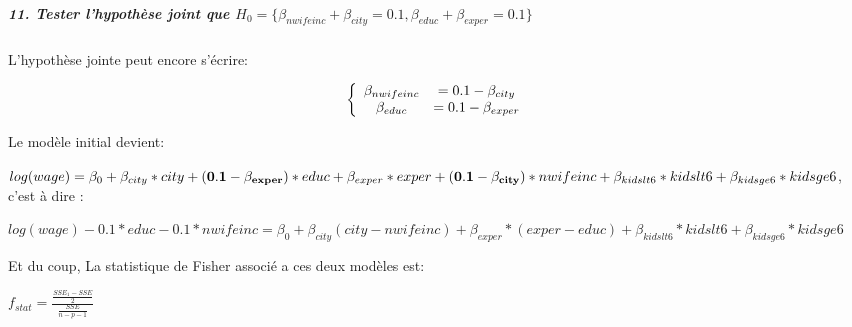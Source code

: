 \documentclass[11pt]{article}
\begin{document}
    \hypertarget{tester-lhypothuxe8se-joint-que-h_0-beta_nwifeincbeta_city0.1-beta_educbeta_exper0.1}{%
\subparagraph{\texorpdfstring{11. Tester l'hypothèse joint que
\(H_0=\{ \beta_{nwifeinc}+\beta_{city}=0.1, \beta_{educ}+\beta_{exper}=0.1 \}\)}{11. Tester l'hypothèse joint que H\_0=\textbackslash\{ \textbackslash beta\_\{nwifeinc\}+\textbackslash beta\_\{city\}=0.1, \textbackslash beta\_\{educ\}+\textbackslash beta\_\{exper\}=0.1 \textbackslash\}}}\label{tester-lhypothuxe8se-joint-que-h_0-beta_nwifeincbeta_city0.1-beta_educbeta_exper0.1}}

    L'hypothèse jointe peut encore s'écrire:

\[
\left \{
\begin{array}{c c}
    \beta_{nwifeinc} &= 0.1- \beta_{city} \\
   \beta_{educ} &= 0.1 -  \beta_{exper}
\end{array}
\right.
\]

    Le modèle initial devient:

\(log(wage)= \beta_0 + \beta_{city}*city + {\bf (0.1 - \beta_{exper})}*educ + \beta_{exper}*exper +{\bf (0.1- \beta_{city})}*nwifeinc+ \beta_{kidslt6}*kidslt6+\beta_{kidsge6}*kidsge6\),
c'est à dire :

\(log(wage)- 0.1*educ -0.1*nwifeinc= \beta_0 + \beta_{city}(city-nwifeinc) + \beta_{exper}*(exper-educ)+ \beta_{kidslt6}*kidslt6+\beta_{kidsge6}*kidsge6\)

    Et du coup, La statistique de Fisher associé a ces deux modèles est:

\(f_{stat} = \frac{\frac{SSE_1-SSE}{2}}{\frac{SSE}{n-p-1}}\)
\end{document}
